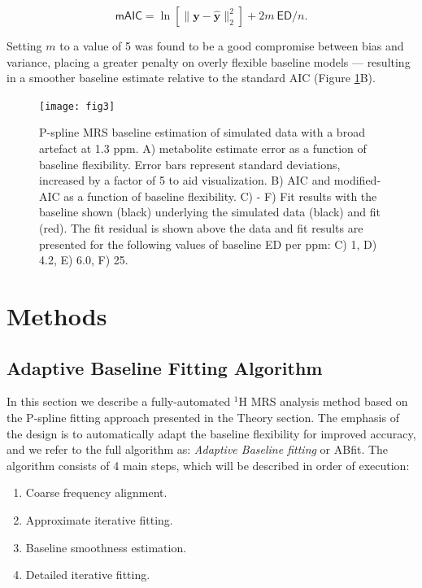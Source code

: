 \documentclass[num-refs]{wiley-article}
\begin{document}
\begin{equation}
  \textsf{mAIC} = \ln \left[ \|\mathbf{y} - \hat{\mathbf{y}}\|^{2}_{2} \right] + 2 m \ \textsf{ED} / n.
  \label{maic}
\end{equation}

Setting $m$ to a value of 5 was found to be a good compromise between bias and variance, placing a greater penalty on overly flexible baseline models --- resulting in a smoother baseline estimate relative to the standard AIC (Figure \ref{mrs_bl_simple}B).

\begin{figure}
  \begin{center}
    \texttt{[image: fig3]}
    \caption{P-spline MRS baseline estimation of simulated data with a broad artefact at 1.3 ppm. A) metabolite estimate error as a function of baseline flexibility. Error bars represent standard deviations, increased by a factor of 5 to aid visualization. B) AIC and modified-AIC as a function of baseline flexibility. C) - F) Fit results with the baseline shown (black) underlying the simulated data (black) and fit (red). The fit residual is shown above the data and fit results are presented for the following values of baseline ED per ppm: C) 1, D) 4.2, E) 6.0, F) 25.}
    \label{mrs_bl_simple}
  \end{center}
\end{figure}

\section{Methods}
\subsection{Adaptive Baseline Fitting Algorithm}
In this section we describe a fully-automated $^1\mathrm{H}$ MRS analysis method based on the P-spline fitting approach presented in the Theory section. The emphasis of the design is to automatically adapt the baseline flexibility for improved accuracy, and we refer to the full algorithm as: \textit{Adaptive Baseline fitting} or ABfit. The algorithm consists of 4 main steps, which will be described in order of execution:

\begin{enumerate}
  \item Coarse frequency alignment.
  \item Approximate iterative fitting.
  \item Baseline smoothness estimation.
  \item Detailed iterative fitting.
\end{enumerate}
\end{document}

